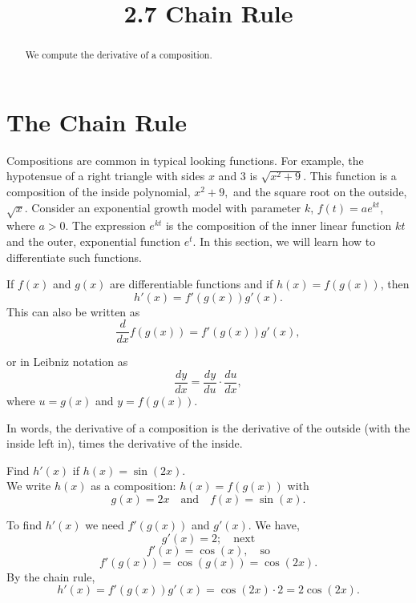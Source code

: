 \documentclass{ximera}
\title{2.7 Chain Rule}
\begin{document}
\begin{abstract}
We compute the derivative of  a composition.
\end{abstract}

\maketitle

\section{The Chain Rule}

Compositions are common in typical looking functions.
For example, the hypotensue of a right triangle with sides $x$ and $3$ is $\sqrt{x^2 + 9}$.  This function is a composition of the inside polynomial, $x^2 + 9,$
and the square root on the outside, $\sqrt{x}$.
Consider an exponential growth model with parameter $k$, $f(t) = ae^{kt}$, where $a>0$. The expression $e^{kt}$ is the composition of the inner linear function $kt$
and the outer, exponential function $e^t$. In this section, we will learn how to differentiate such functions.
\begin{theorem} If $f(x)$ and $g(x)$ are differentiable functions and if $h(x) = f(g(x))$, then
\[
h'(x) = f'(g(x))g'(x).
\]
This can also be written as 
\[
\frac{d}{dx}f(g(x)) = f'(g(x))g'(x),
\]

or in Leibniz notation as 
\[
\frac{dy}{dx} = \frac{dy}{du} \cdot \frac{du}{dx},
\]
where $u = g(x)$ and $y= f(g(x))$.
\end{theorem}



In words, the derivative of a composition is the derivative of the outside (with the inside left in),   
times the derivative of the inside.



\begin{example}[example 1]
Find $h'(x)$ if $h(x) = \sin(2x)$.\\
We write $h(x)$ as a composition: $h(x)=f(g(x))$ with
\[g(x) = 2x   \quad \text{and} \quad  f(x) = \sin(x).\]


To find $h'(x)$ we need $f'(g(x))$ and $g'(x)$. We have,
\[g'(x) = 2; \quad \text{next} \]
\[f'(x) = \cos(x), \quad \text{so}\]
\[f'(g(x)) =\cos(g(x)) = \cos(2x).\]
By the chain rule,
\[h'(x) = f'(g(x))g'(x) = \cos(2x) \cdot 2 = 2\cos(2x).\]
\end{example}

\begin{center}
\begin{foldable}
\end{foldable}
\end{center}
\end{document}
